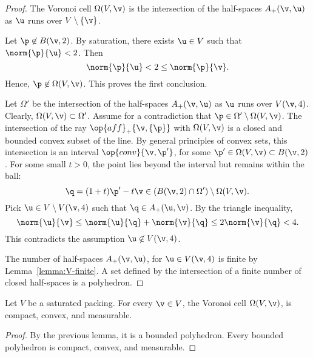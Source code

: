 \begin{proof} 
The Voronoi cell $\Omega(V,\v)$ is the
intersection of the half-spaces $A_+(\v,\u)$ as $\u$ runs over
$V\setminus \{\v\}$.

Let $\p\not\in B(\v,2)$.  
By saturation, there exists $\u\in V$ such that $\norm{\p}{\u}<2$.
Then 
\begin{displaymath} 
\norm{\p}{\u} < 2 \le \norm{\p}{\v}.
\end{displaymath}
Hence, $\p\not\in\Omega(V,\v)$.  This proves the first conclusion.


Let $\Omega'$ be the intersection of the half-spaces $A_+(\v,\u)$ as
$\u$ runs over $V(\v,4)$.  Clearly, $\Omega(V,\v)\subset \Omega'$.
Assume for a contradiction that $\p\in \Omega'\setminus\Omega(V,\v)$.
The intersection of the ray $\op{aff}_+\{\v,\{\p\}\}$ with
$\Omega(V,\v)$ is a closed and bounded convex subset of the line.  By
general principles of convex sets, this intersection is an interval
$\op{conv}\{\v,\p'\}$, for some $\p'\in\Omega(V,\v)\subset B(\v,2)$.
For some small $t>0$, the point lies beyond the interval but remains
within the ball:
\begin{displaymath} 
\q = (1+t)\p' -t \v\in (B(\v,2)\cap \Omega')\setminus \Omega(V,\v).
\end{displaymath}
Pick $\u\in V\setminus V(\v,4)$ such that $\q\in A_+(\u,\v)$.  By the
triangle inequality,
\begin{displaymath} 
\norm{\u}{\v} \le \norm{\u}{\q} + \norm{\v}{\q} \le 2\norm{\v}{\q} < 4.
\end{displaymath}
This contradicts the assumption $\u\not\in V(\v,4)$.

The number of half-spaces $A_+(\v,\u)$, for $\u\in V(\v,4)$ is finite by
Lemma~\ref{lemma:V-finite}.  A set defined by the intersection of a finite number
of closed half-spaces is a polyhedron.
\end{proof}

\begin{lemma}
Let $ V$ be a saturated packing.  For every $\v\in  V$, 
the Voronoi cell $\Omega( V,\v)$,  is
compact, convex, and measurable.
\end{lemma}

\begin{proof}  By the previous lemma, it is a bounded polyhedron.  Every bounded
polyhedron is compact, convex, and measurable.
\end{proof}




